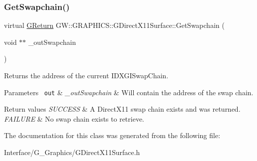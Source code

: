 \subsubsection{\texorpdfstring{GetSwapchain()}{GetSwapchain()}}
{\footnotesize\ttfamily virtual \mbox{\hyperlink{namespaceGW_a67a839e3df7ea8a5c5686613a7a3de21}{G\+Return}} G\+W\+::\+G\+R\+A\+P\+H\+I\+C\+S\+::\+G\+Direct\+X11\+Surface\+::\+Get\+Swapchain (\begin{DoxyParamCaption}\item[{void $\ast$$\ast$}]{\+\_\+out\+Swapchain }\end{DoxyParamCaption})\hspace{0.3cm}{\ttfamily [pure virtual]}}



Returns the address of the current I\+D\+X\+G\+I\+Swap\+Chain. 


\begin{DoxyParams}[1]{Parameters}
\mbox{\texttt{ out}}  & {\em \+\_\+out\+Swapchain} & Will contain the address of the swap chain.\\
\hline
\end{DoxyParams}

\begin{DoxyRetVals}{Return values}
{\em S\+U\+C\+C\+E\+SS} & A Direct\+X11 swap chain exists and was returned. \\
\hline
{\em F\+A\+I\+L\+U\+RE} & No swap chain exists to retrieve. \\
\hline
\end{DoxyRetVals}


The documentation for this class was generated from the following file\+:\begin{DoxyCompactItemize}
\item 
Interface/\+G\+\_\+\+Graphics/G\+Direct\+X11\+Surface.\+h\end{DoxyCompactItemize}
